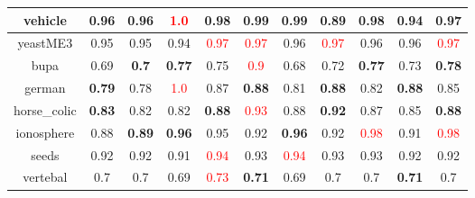 \documentclass{article}%
\begin{document}
\begin{tabular}{c|cccccccccc}
\hline%
vehicle&0.96&0.96&\textcolor{red}{ 
1.0
}&0.98&0.99&0.99&0.89&\textbf{0.98}&0.94&\textbf{0.97}\\%
\hline%
yeastME3&0.95&0.95&0.94&\textcolor{red}{ 
0.97
}&\textcolor{red}{ 
0.97
}&0.96&\textcolor{red}{ 
0.97
}&0.96&0.96&\textcolor{red}{ 
0.97
}\\%
\hline%
bupa&0.69&\textbf{0.7}&\textbf{0.77}&0.75&\textcolor{red}{ 
0.9
}&0.68&0.72&\textbf{0.77}&0.73&\textbf{0.78}\\%
\hline%
german&\textbf{0.79}&0.78&\textcolor{red}{ 
1.0
}&0.87&\textbf{0.88}&0.81&\textbf{0.88}&0.82&\textbf{0.88}&0.85\\%
\hline%
horse\_colic&\textbf{0.83}&0.82&0.82&\textbf{0.88}&\textcolor{red}{ 
0.93
}&0.88&\textbf{0.92}&0.87&0.85&\textbf{0.88}\\%
\hline%
ionosphere&0.88&\textbf{0.89}&\textbf{0.96}&0.95&0.92&\textbf{0.96}&0.92&\textcolor{red}{ 
0.98
}&0.91&\textcolor{red}{ 
0.98
}\\%
\hline%
seeds&0.92&0.92&0.91&\textcolor{red}{ 
0.94
}&0.93&\textcolor{red}{ 
0.94
}&0.93&0.93&0.92&0.92\\%
\hline%
vertebal&0.7&0.7&0.69&\textcolor{red}{ 
0.73
}&\textbf{0.71}&0.69&0.7&0.7&\textbf{0.71}&0.7\\%
\hline%
\end{tabular}

%
\end{document}
